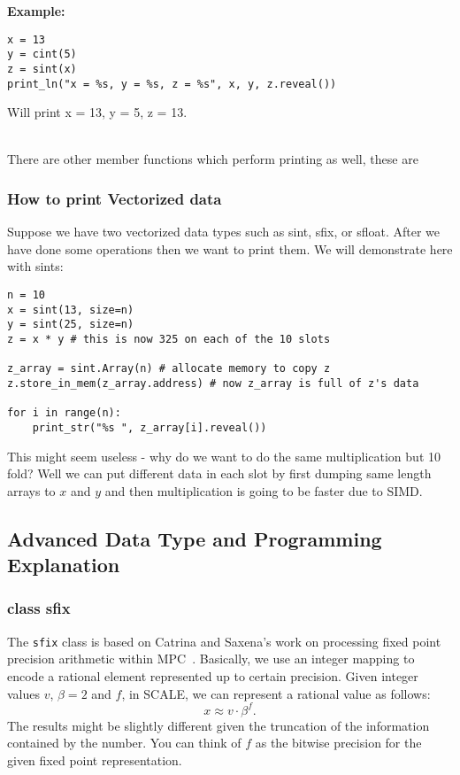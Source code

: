 \noindent
\textbf{Example:}
\begin{lstlisting}
x = 13
y = cint(5)
z = sint(x)
print_ln("x = %s, y = %s, z = %s", x, y, z.reveal())
\end{lstlisting}
Will print x = 13, y = 5, z = 13.

~\\

\noindent
There are other member functions which perform printing as well, these are


\subsubsection{How to print Vectorized data}
Suppose we have two vectorized data types such as sint, sfix, or sfloat. After we have done some operations then we want to print them. We will demonstrate here with sints:

\begin{lstlisting}
n = 10
x = sint(13, size=n)
y = sint(25, size=n)
z = x * y # this is now 325 on each of the 10 slots

z_array = sint.Array(n) # allocate memory to copy z
z.store_in_mem(z_array.address) # now z_array is full of z's data

for i in range(n):
	print_str("%s ", z_array[i].reveal())
\end{lstlisting}
This might seem useless - why do we want to do the same multiplication but 10 fold? Well we can put different data in each slot by first dumping same length arrays to $x$ and $y$ and then multiplication is going to be faster due to SIMD.

\subsection{Advanced Data Type and Programming Explanation}

\subsubsection{class sfix}
The \verb|sfix| class is based on Catrina and Saxena's work on processing fixed point precision arithmetic within MPC~\cite{CS10}. Basically, we use an integer mapping to encode a rational element represented up to certain precision.
Given integer values $v$, $\beta =2$ and $f$, in SCALE, we can represent a rational value as follows:
\[
  x \approx v \cdot \beta ^{f}.
\]
The results might be slightly different given the truncation of the information contained by the number. You can think of $f$ as the bitwise precision for the given fixed point representation.

